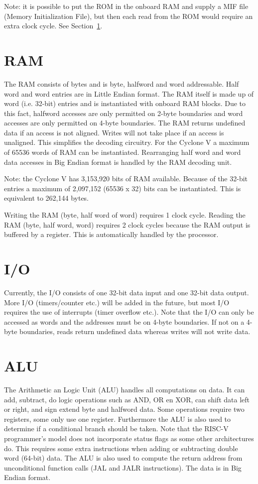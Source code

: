 \documentclass[12pt]{article}
\begin{document}
Note: it is possible to put the ROM in the onboard RAM and supply a MIF file (Memory Initialization File), but then each read from the ROM would require an extra clock cycle. See Section~\ref{sec:ram}.

\section{RAM}
\label{sec:ram}
The RAM consists of bytes and is byte, halfword and word addressable. Half word and word entries are in Little Endian format. The RAM itself is made up of word (i.e. 32-bit) entries and is instantiated with onboard RAM blocks. Due to this fact, halfword accesses are only permitted on 2-byte boundaries and word accesses are only permitted on 4-byte boundaries. The RAM returns undefined data if an access is not aligned. Writes will not take place if an access is unaligned. This simplifies the decoding circuitry. For the Cyclone V a maximum of 65536 words of RAM can be instantiated. Rearranging half word and word data accesses in Big Endian format is handled by the RAM decoding unit.

Note: the Cyclone V has 3,153,920 bits of RAM available. Because of the 32-bit entries a maximum of 2,097,152 (65536 x 32) bits can be instantiated. This is equivalent to 262,144 bytes.

Writing the RAM (byte, half word of word) requires 1 clock cycle. Reading the RAM (byte, half word, word) requires 2 clock cycles because the RAM output is buffered by a register. This is automatically handled by the processor.

\section{I/O}
\label{sec/io}
Currently, the I/O consists of one 32-bit data input and one 32-bit data output. More I/O (timers/counter etc.) will be added in the future, but most I/O requires the use of interrupts (timer overflow etc.). Note that the I/O can only be accessed as words and the addresses must be on 4-byte boundaries. If not on a 4-byte boundaries, reads return undefined data whereas writes will not write data.

\section{ALU}
\label{sec:alu}
The Arithmetic an Logic Unit (ALU) handles all computations on data. It can add, subtract, do logic operations such as AND, OR en XOR, can shift data left or right, and sign extend byte and halfword data. Some operations require two registers, some only use one register. Furthermore the ALU is also used to determine if a conditional branch should be taken. Note that the RISC-V programmer's model does not incorporate status flags as some other architectures do. This requires some extra instructions when adding or subtracting double word (64-bit) data. The ALU is also used to compute the return address from unconditional function calls (JAL and JALR instructions). The data is in Big Endian format.
\end{document}
